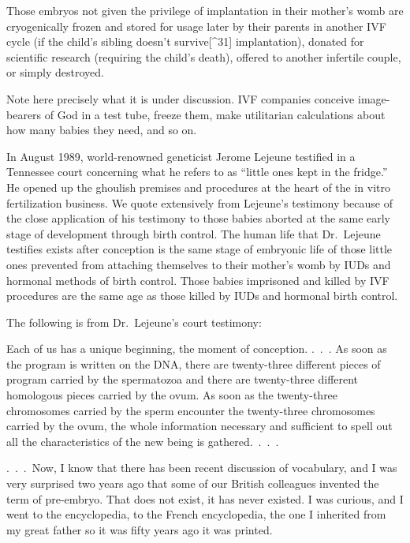 \documentclass[
]{book}
\begin{document}
Those embryos not given the privilege of implantation in their mother's womb are cryogenically frozen and stored for usage later by their parents in another IVF cycle (if the child's sibling doesn't survive{[}\^{}31{]} implantation), donated for scientific research (requiring the child's death), offered to another infertile couple, or simply destroyed.

Note here precisely what it is under discussion. IVF companies conceive image-bearers of God in a test tube, freeze them, make utilitarian calculations about how many babies they need, and so on.

In August 1989, world-renowned geneticist Jerome Lejeune testified in a Tennessee court concerning what he refers to as ``little ones kept in the fridge.'' He opened up the ghoulish premises and procedures at the heart of the in vitro fertilization business. We quote extensively from Lejeune's testimony because of the close application of his testimony to those babies aborted at the same early stage of development through birth control. The human life that Dr.~Lejeune testifies exists after conception is the same stage of embryonic life of those little ones prevented from attaching themselves to their mother's womb by IUDs and hormonal methods of birth control. Those babies imprisoned and killed by IVF procedures are the same age as those killed by IUDs and hormonal birth control.

The following is from Dr.~Lejeune's court testimony:

Each of us has a unique beginning, the moment of conception. .~.~. As soon as the program is written on the DNA, there are twenty-three different pieces of program carried by the spermatozoa and there are twenty-three different homologous pieces carried by the ovum. As soon as the twenty-three chromosomes carried by the sperm encounter the twenty-three chromosomes carried by the ovum, the whole information necessary and sufficient to spell out all the characteristics of the new being is gathered.~.~.~.

.~.~.~Now, I know that there has been recent discussion of vocabulary, and I was very surprised two years ago that some of our British colleagues invented the term of pre-embryo. That does not exist, it has never existed. I was curious, and I went to the encyclopedia, to the French encyclopedia, the one I inherited from my great father so it was fifty years ago it was printed.
\end{document}
